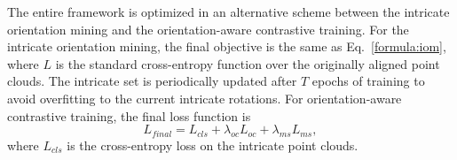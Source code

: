 


The entire framework is optimized in an alternative scheme between the intricate orientation mining and the orientation-aware contrastive training.
For the intricate orientation mining, the final objective is the same as Eq.~\ref{formula:iom}, where $L$ is the standard cross-entropy function over the originally aligned point clouds.
The intricate set is periodically updated after $T$ epochs of training to avoid overfitting to the current intricate rotations.
For orientation-aware contrastive training, the final loss function is
\begin{equation}
    L_{final} = L_{cls} + \lambda_{oc} L_{oc} + \lambda_{ms} L_{ms},
    \label{eq9}
\end{equation}
where $L_{cls}$ is the cross-entropy loss on the intricate point clouds. 

